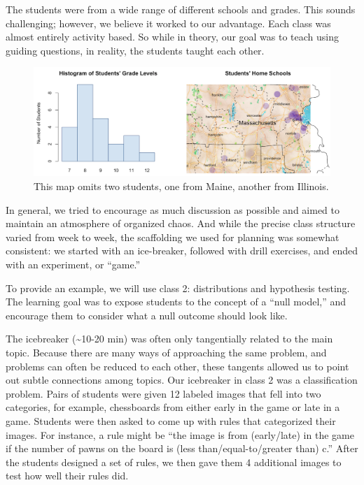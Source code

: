 \documentclass[12pt,twoside]{mitthesis-manusdown}
\begin{document}
The students were from a wide range of different schools and grades.
This sounds challenging; however, we believe it worked to our advantage.
Each class was almost entirely activity based. So while in theory, our
goal was to teach using guiding questions, in reality, the students
taught each other.
\begin{figure}[tb!]

{\centering \includegraphics[width=0.9\linewidth]{figuresteaching/studentDem} 

}

\caption{\label{fig:studentDem}This map omits two students, one from Maine, another from Illinois.}\label{fig:studentDem}
\end{figure}
In general, we tried to encourage as much discussion as possible and
aimed to maintain an atmosphere of organized chaos. And while the
precise class structure varied from week to week, the scaffolding we
used for planning was somewhat consistent: we started with an
ice-breaker, followed with drill exercises, and ended with an
experiment, or ``game.''

To provide an example, we will use class 2: distributions and hypothesis
testing. The learning goal was to expose students to the concept of a
``null model,'' and encourage them to consider what a null outcome
should look like.

The icebreaker (\textasciitilde{}10-20 min) was often only tangentially
related to the main topic. Because there are many ways of approaching
the same problem, and problems can often be reduced to each other, these
tangents allowed us to point out subtle connections among topics. Our
icebreaker in class 2 was a classification problem. Pairs of students
were given 12 labeled images that fell into two categories, for example,
chessboards from either early in the game or late in a game. Students
were then asked to come up with rules that categorized their images. For
instance, a rule might be ``the image is from (early/late) in the game
if the number of pawns on the board is (less than/equal-to/greater than)
c.'' After the students designed a set of rules, we then gave them 4
additional images to test how well their rules did.
\end{document}
